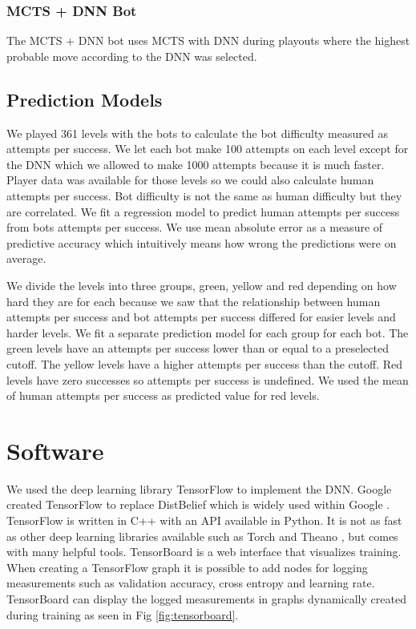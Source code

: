 \documentclass{kththesis}
\begin{document}
\subsubsection{MCTS + DNN Bot}
The MCTS + DNN bot uses MCTS with DNN during playouts where the highest probable move according to the DNN was selected.

\subsection{Prediction Models}
We played 361 levels with the bots to calculate the bot difficulty measured as attempts per success. We let each bot make 100 attempts on each level except for the DNN which we allowed to make 1000 attempts because it is much faster. Player data was available for those levels so we could also calculate human attempts per success. Bot difficulty is not the same as human difficulty but they are correlated. We fit a regression model to predict human attempts per success from bots attempts per success. We use mean absolute error as a measure of predictive accuracy which intuitively means how wrong the predictions were on average.

We divide the levels into three groups, green, yellow and red depending on how hard they are for each because we saw that the relationship between human attempts per success and bot attempts per success differed for easier levels and harder levels. We fit a separate prediction model for each group for each bot. The green levels have an attempts per success lower than or equal to a preselected cutoff. The yellow levels  have a higher attempts per success than the cutoff. Red levels have zero successes so attempts per success is undefined. We used the mean of human attempts per success as predicted value for red levels.

\section{Software}
We used the deep learning library TensorFlow to implement the DNN. Google created TensorFlow to replace DistBelief which is widely used within Google \cite{abadi2016tensorflow}. TensorFlow is written in C++ with an API available in Python. It is not as fast as other deep learning libraries available such as Torch and Theano \cite{bahrampour2015comparative}, but comes with many helpful tools. TensorBoard is a web interface that visualizes training. When creating a TensorFlow graph it is possible to add nodes for logging measurements such as validation accuracy, cross entropy and learning rate. TensorBoard can display the logged measurements in graphs  dynamically created during training as seen in Fig \ref{fig:tensorboard}. 
\end{document}
